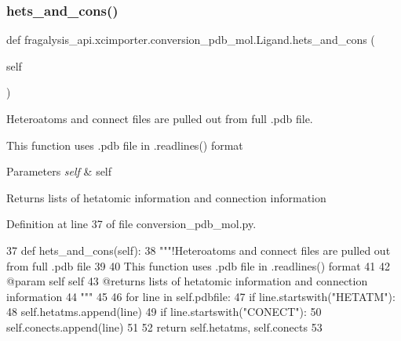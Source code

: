 \subsubsection{\texorpdfstring{hets\+\_\+and\+\_\+cons()}{hets\_and\_cons()}}
{\footnotesize\ttfamily def fragalysis\+\_\+api.\+xcimporter.\+conversion\+\_\+pdb\+\_\+mol.\+Ligand.\+hets\+\_\+and\+\_\+cons (\begin{DoxyParamCaption}\item[{}]{self }\end{DoxyParamCaption})}



Heteroatoms and connect files are pulled out from full .pdb file. 

This function uses .pdb file in .readlines() format


\begin{DoxyParams}{Parameters}
{\em self} & self \\
\hline
\end{DoxyParams}
\begin{DoxyReturn}{Returns}
lists of hetatomic information and connection information 
\end{DoxyReturn}


Definition at line 37 of file conversion\+\_\+pdb\+\_\+mol.\+py.


\begin{DoxyCode}
37     \textcolor{keyword}{def }hets\_and\_cons(self):
38         \textcolor{stringliteral}{"""!Heteroatoms and connect files are pulled out from full .pdb file}
39 \textcolor{stringliteral}{        }
40 \textcolor{stringliteral}{        This function uses .pdb file in .readlines() format}
41 \textcolor{stringliteral}{        }
42 \textcolor{stringliteral}{        @param self self}
43 \textcolor{stringliteral}{        @returns lists of hetatomic information and connection information}
44 \textcolor{stringliteral}{        """}
45 
46         \textcolor{keywordflow}{for} line \textcolor{keywordflow}{in} self.pdbfile:
47             \textcolor{keywordflow}{if} line.startswith(\textcolor{stringliteral}{"HETATM"}):
48                 self.hetatms.append(line)
49             \textcolor{keywordflow}{if} line.startswith(\textcolor{stringliteral}{"CONECT"}):
50                 self.conects.append(line)
51 
52         \textcolor{keywordflow}{return} self.hetatms, self.conects
53 
\end{DoxyCode}
\mbox{\label{classfragalysis__api_1_1xcimporter_1_1conversion__pdb__mol_1_1_ligand_af21865a4bb9be6aab21bfc82668ba25e}} 
